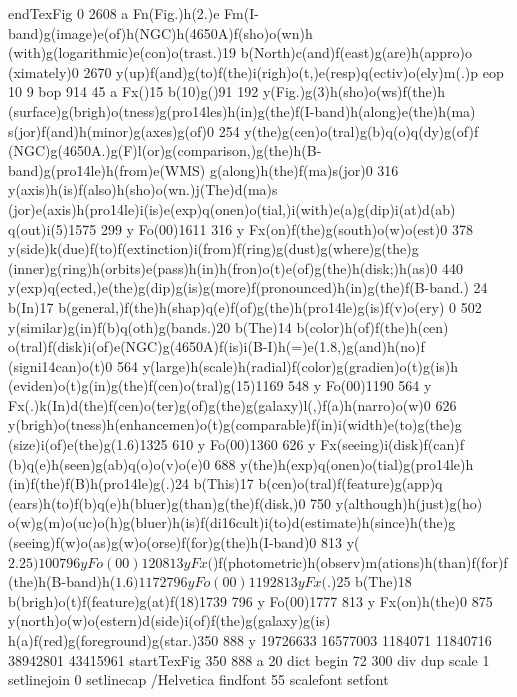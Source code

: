 {{{{{{{{{{{{{{{{{{{{{ endTexFig
 0 2608 a Fn(Fig.)h(2.{)e Fm(I-band)g(image)e(of)h(NGC)h(4650A)f(sho)o(wn)h
(with)g(logarithmic)e(con)o(trast.)19 b(North)c(and)f(east)g(are)h(appro)o
(ximately)0 2670 y(up)f(and)g(to)f(the)i(righ)o(t,)e(resp)q(ectiv)o(ely)m(.)p
eop
10 9 bop 914 45 a Fx({)15 b(10)g({)91 192 y(Fig.)g(3)h(sho)o(ws)f(the)h
(surface)g(brigh)o(tness)g(pro\014les)h(in)g(the)f(I-band)h(along)e(the)h(ma)
s(jor)f(and)h(minor)g(axes)g(of)0 254 y(the)g(cen)o(tral)g(b)q(o)q(dy)g(of)f
(NGC)g(4650A.)g(F)l(or)g(comparison,)g(the)h(B-band)g(pro\014le)h(from)e(WMS)
g(along)h(the)f(ma)s(jor)0 316 y(axis)h(is)f(also)h(sho)o(wn.)j(The)d(ma)s
(jor)e(axis)h(pro\014le)i(is)e(exp)q(onen)o(tial,)i(with)e(a)g(dip)i(at)d(ab)
q(out)i(5)1575 299 y Fo(00)1611 316 y Fx(on)f(the)g(south)o(w)o(est)0
378 y(side)k(due)f(to)f(extinction)i(from)f(ring)g(dust)g(where)g(the)g
(inner)g(ring)h(orbits)e(pass)h(in)h(fron)o(t)e(of)g(the)h(disk;)h(as)0
440 y(exp)q(ected,)e(the)g(dip)g(is)g(more)f(pronounced)h(in)g(the)f(B-band.)
24 b(In)17 b(general,)f(the)h(shap)q(e)f(of)g(the)h(pro\014le)g(is)f(v)o(ery)
0 502 y(similar)g(in)f(b)q(oth)g(bands.)20 b(The)14 b(color)h(of)f(the)h(cen)
o(tral)f(disk)i(of)e(NGC)g(4650A)f(is)i(B-I)h(=)e(1.8,)g(and)h(no)f
(signi\014can)o(t)0 564 y(large)h(scale)h(radial)f(color)g(gradien)o(t)g(is)h
(eviden)o(t)g(in)g(the)f(cen)o(tral)g(15)1169 548 y Fo(00)1190
564 y Fx(.)k(In)d(the)f(cen)o(ter)g(of)g(the)g(galaxy)l(,)f(a)h(narro)o(w)0
626 y(brigh)o(tness)h(enhancemen)o(t)g(comparable)f(in)i(width)e(to)g(the)g
(size)i(of)e(the)g(1.6)1325 610 y Fo(00)1360 626 y Fx(seeing)i(disk)f(can)f
(b)q(e)h(seen)g(ab)q(o)o(v)o(e)0 688 y(the)h(exp)q(onen)o(tial)g(pro\014le)h
(in)f(the)f(B)h(pro\014le)g(.)24 b(This)17 b(cen)o(tral)f(feature)g(app)q
(ears)h(to)f(b)q(e)h(bluer)g(than)g(the)f(disk,)0 750 y(although)h(just)g(ho)
o(w)g(m)o(uc)o(h)g(bluer)h(is)f(di\016cult)i(to)d(estimate)h(since)h(the)g
(seeing)f(w)o(as)g(w)o(orse)f(for)g(the)h(I-band)0 813 y(\(2.25)100
796 y Fo(00)120 813 y Fx(\))f(photometric)h(observ)m(ations)h(than)f(for)f
(the)h(B-band)h(\(1.6)1172 796 y Fo(00)1192 813 y Fx(\).)25
b(The)18 b(brigh)o(t)f(feature)g(at)f(18)1739 796 y Fo(00)1777
813 y Fx(on)h(the)0 875 y(north)o(w)o(estern)d(side)i(of)f(the)g(galaxy)g(is)
h(a)f(red)g(foreground)g(star.)350 888 y
 19726633 16577003 1184071 11840716 38942801 43415961 startTexFig
 350 888 a
 20 dict begin
72 300 div dup scale
1 setlinejoin 0 setlinecap
/Helvetica findfont 55 scalefont setfont 
}}}}}}}}}}}}}}}}}}}}}}}}

